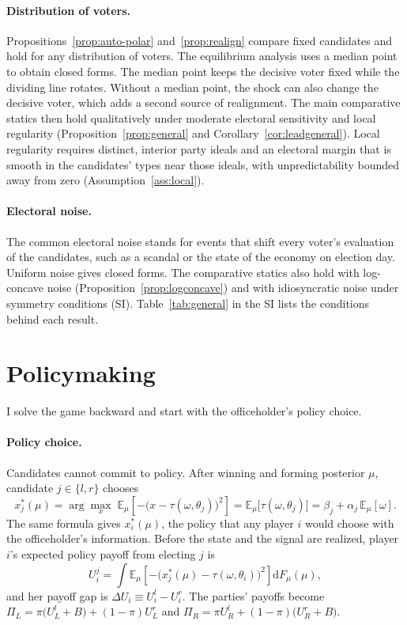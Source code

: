 \documentclass[12pt,letterpaper]{article}
\begin{document}
\paragraph{Distribution of voters.} Propositions~\ref{prop:auto-polar} and~\ref{prop:realign} compare fixed candidates and hold for any distribution of voters. The equilibrium analysis uses a median point to obtain closed forms. The median point keeps the decisive voter fixed while the dividing line rotates. Without a median point, the shock can also change the decisive voter, which adds a second source of realignment. The main comparative statics then hold qualitatively under moderate electoral sensitivity and local regularity (Proposition~\ref{prop:general} and Corollary~\ref{cor:leadgeneral}). Local regularity requires distinct, interior party ideals and an electoral margin that is smooth in the candidates' types near those ideals, with unpredictability bounded away from zero (Assumption~\ref{ass:local}).

\paragraph{Electoral noise.} The common electoral noise stands for events that shift every voter's evaluation of the candidates, such as a scandal or the state of the economy on election day. Uniform noise gives closed forms. The comparative statics also hold with log-concave noise (Proposition~\ref{prop:logconcave}) and with idiosyncratic noise under symmetry conditions (SI). Table~\ref{tab:general} in the SI lists the conditions behind each result.

\section{Policymaking}\label{sec:policy}

I solve the game backward and start with the officeholder's policy choice.

\paragraph{Policy choice.}
Candidates cannot commit to policy. After winning and forming posterior $\mu$, candidate $j\in\{l,r\}$ chooses
\[
x^*_j(\mu)=\arg\max_{x}\;\mathbb{E}_\mu\!\left[-\big(x-\tau(\omega,\theta_j)\big)^2\right]=\mathbb{E}_\mu\big[\tau(\omega,\theta_j)\big]=\beta_j+\alpha_j\,\mathbb{E}_\mu[\omega].
\]
The same formula gives $x^*_i(\mu)$, the policy that any player $i$ would choose with the officeholder's information. Before the state and the signal are realized, player $i$'s expected policy payoff from electing $j$ is
\[
U_i^j=\int \mathbb{E}_\mu\!\left[-\big(x^*_j(\mu)-\tau(\omega,\theta_i)\big)^2\right]\mathrm{d}F_\mu(\mu),
\]
and her payoff gap is $\Delta U_i\equiv U_i^l-U_i^r$. The parties' payoffs become $\Pi_L=\pi\big(U_L^l+B\big)+(1-\pi)U_L^r$ and $\Pi_R=\pi U_R^l+(1-\pi)\big(U_R^r+B\big)$.
\end{document}
